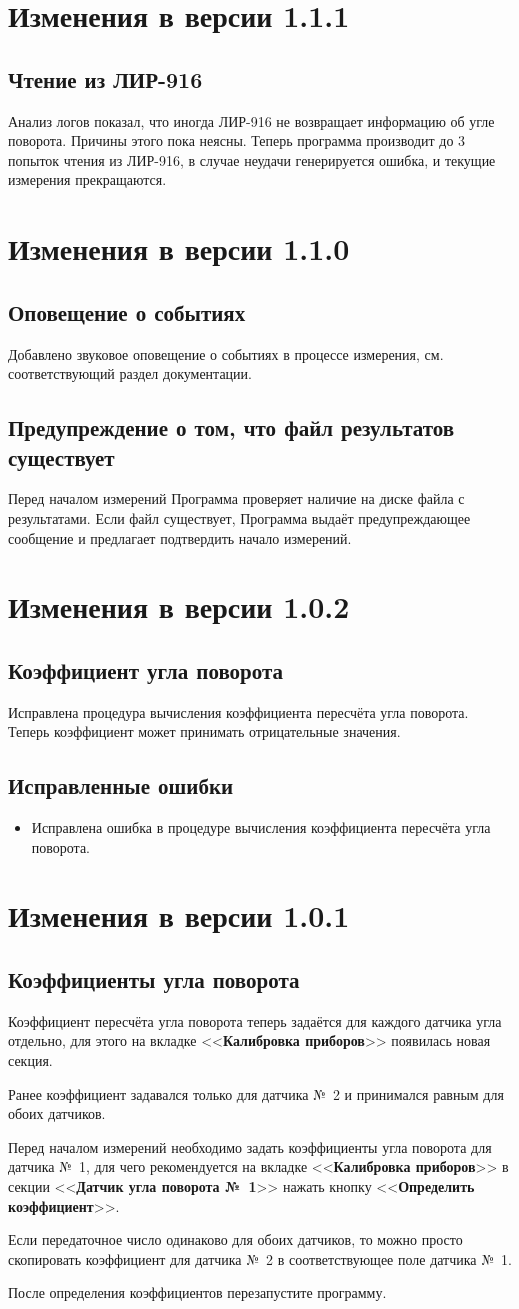 \documentclass[12pt, a4paper]{article}
\newcommand{\CTRL}[1]{<<{\bf #1}>>}
\newcommand{\VERSION}[1]{\section*{Изменения в версии #1}}
\newcommand{\ITEM}[1]{\subsection*{#1}}
\newcommand{\FIXEDERRORS}{\subsection*{Исправленные ошибки}}
\begin{document}
\VERSION{1.1.1}

\ITEM{Чтение из ЛИР-916}

Анализ логов показал, что иногда ЛИР-916 не возвращает информацию об угле поворота. Причины этого пока неясны. Теперь программа производит до 3 попыток чтения из ЛИР-916, в случае неудачи генерируется ошибка, и текущие измерения прекращаются.

\VERSION{1.1.0}

\ITEM{Оповещение о событиях}

Добавлено звуковое оповещение о событиях в процессе измерения, см. соответствующий раздел документации.

\ITEM{Предупреждение о том, что файл результатов существует}

Перед началом измерений Программа проверяет наличие на диске файла с результатами. Если файл существует, Программа выдаёт предупреждающее сообщение и предлагает подтвердить начало измерений.

\VERSION{1.0.2}

\ITEM{Коэффициент угла поворота}

Исправлена процедура вычисления коэффициента пересчёта угла поворота. Теперь коэффициент может принимать отрицательные значения.

\FIXEDERRORS

\begin{itemize}
\item Исправлена ошибка в процедуре вычисления коэффициента пересчёта угла поворота.
\end{itemize}

\VERSION{1.0.1}

\ITEM{Коэффициенты угла поворота}

Коэффициент пересчёта угла поворота теперь задаётся для каждого датчика угла отдельно, для этого на вкладке \CTRL{Калибровка приборов} появилась новая секция.

Ранее коэффициент задавался только для датчика №~2 и принимался равным для обоих датчиков.

Перед началом измерений необходимо задать коэффициенты угла поворота для датчика №~1, для чего рекомендуется на вкладке \CTRL{Калибровка приборов} в секции \CTRL{Датчик угла поворота №~1} нажать кнопку \CTRL{Определить коэффициент}.

Если передаточное число одинаково для обоих датчиков, то можно просто скопировать коэффициент для датчика №~2 в соответствующее поле датчика №~1.

После определения коэффициентов перезапустите программу.
\end{document}
